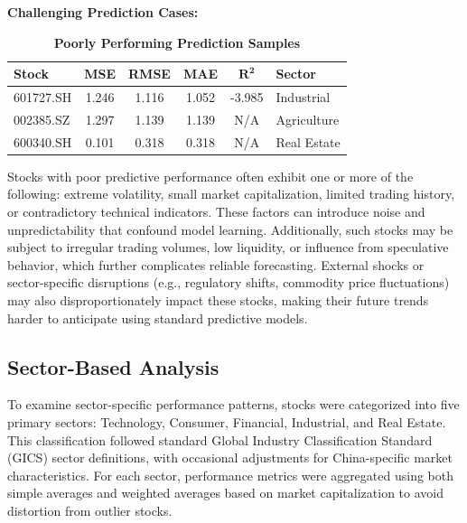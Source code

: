 \documentclass[3p,times,procedia]{elsarticle}
\begin{document}
\vspace{0.80cm}

\textbf{Challenging Prediction Cases:}

\begin{table}[!ht]
\renewcommand{\arraystretch}{1.5} %
\centering
\large %
\caption{\textbf{Poorly Performing Prediction Samples}}
\begin{tabular}{|l|c|c|c|c|l|}
\hline
\textbf{Stock} & \textbf{MSE} & \textbf{RMSE} & \textbf{MAE} & \textbf{$\mathbf{R^2}$} & \textbf{Sector} \\
\hline
601727.SH & 1.246 & 1.116 & 1.052 & -3.985 & Industrial \\
002385.SZ & 1.297 & 1.139 & 1.139 & N/A    & Agriculture \\
600340.SH & 0.101 & 0.318 & 0.318 & N/A    & Real Estate \\
\hline
\end{tabular}
\end{table}

Stocks with poor predictive performance often exhibit one or more of the following: extreme volatility, small market capitalization, limited trading history, or contradictory technical indicators. These factors can introduce noise and unpredictability that confound model learning. Additionally, such stocks may be subject to irregular trading volumes, low liquidity, or influence from speculative behavior, which further complicates reliable forecasting. External shocks or sector-specific disruptions (e.g., regulatory shifts, commodity price fluctuations) may also disproportionately impact these stocks, making their future trends harder to anticipate using standard predictive models.





\subsection{Sector-Based Analysis}
To examine sector-specific performance patterns, stocks were categorized into five primary sectors: Technology, Consumer, Financial, Industrial, and Real Estate. This classification followed standard Global Industry Classification Standard (GICS) sector definitions, with occasional adjustments for China-specific market characteristics. For each sector, performance metrics were aggregated using both simple averages and weighted averages based on market capitalization to avoid distortion from outlier stocks.
\end{document}
